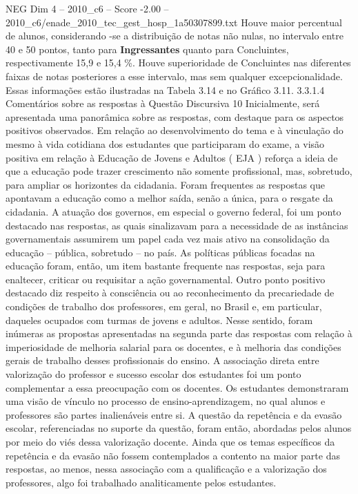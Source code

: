 \begin{textsample}{NEG Dim 4 – 2010\_c6 – Score -2.00 – 2010\_c6/enade\_2010\_tec\_gest\_hosp\_1a50307899.txt}
Houve maior percentual de alunos, considerando -se a distribuição de notas não nulas, no intervalo entre 40 e 50 pontos, tanto para \textbf{Ingressantes} quanto para Concluintes, respectivamente 15,9 e 15,4 \%.
Houve superioridade de Concluintes nas diferentes faixas de notas posteriores a esse intervalo, mas sem qualquer excepcionalidade.
Essas informações estão ilustradas na Tabela 3.14 e no Gráfico 3.11. 3.3.1.4 Comentários sobre as respostas à Questão Discursiva 10 Inicialmente, será apresentada uma panorâmica sobre as respostas, com destaque para os aspectos positivos observados.
Em relação ao desenvolvimento do tema e à vinculação do mesmo à vida cotidiana dos estudantes que participaram do exame, a visão positiva em relação à Educação de Jovens e Adultos ( EJA ) reforça a ideia de que a educação pode trazer crescimento não somente profissional, mas, sobretudo, para ampliar os horizontes da cidadania.
Foram frequentes as respostas que apontavam a educação como a melhor saída, senão a única, para o resgate da cidadania.
A atuação dos governos, em especial o governo federal, foi um ponto destacado nas respostas, as quais sinalizavam para a necessidade de as instâncias governamentais assumirem um papel cada vez mais ativo na consolidação da educação – pública, sobretudo – no país.
As políticas públicas focadas na educação foram, então, um item bastante frequente nas respostas, seja para enaltecer, criticar ou requisitar a ação governamental.
Outro ponto positivo destacado diz respeito à consciência ou ao reconhecimento da precariedade de condições de trabalho dos professores, em geral, no Brasil e, em particular, daqueles ocupados com turmas de jovens e adultos.
Nesse sentido, foram inúmeras as propostas apresentadas na segunda parte das respostas com relação à imperiosidade de melhoria salarial para os docentes, e à melhoria das condições gerais de trabalho desses profissionais do ensino.
A associação direta entre valorização do professor e sucesso escolar dos estudantes foi um ponto complementar a essa preocupação com os docentes.
Os estudantes demonstraram uma visão de vínculo no processo de ensino-aprendizagem, no qual alunos e professores são partes inalienáveis entre si.
A questão da repetência e da evasão escolar, referenciadas no suporte da questão, foram então, abordadas pelos alunos por meio do viés dessa valorização docente.
Ainda que os temas específicos da repetência e da evasão não fossem contemplados a contento na maior parte das respostas, ao menos, nessa associação com a qualificação e a valorização dos professores, algo foi trabalhado analiticamente pelos estudantes.

\end{textsample}
